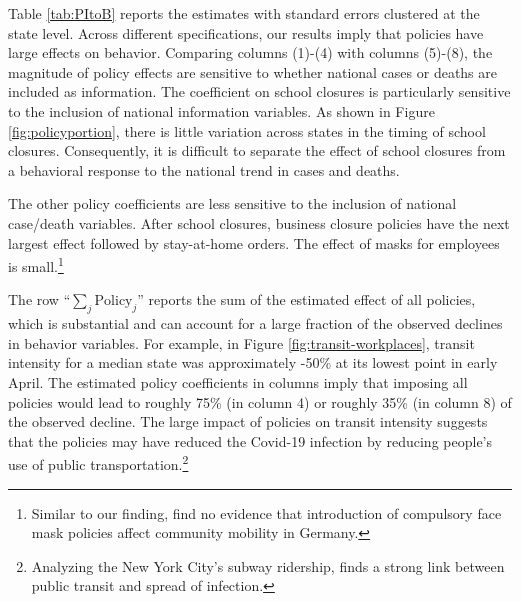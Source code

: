 \documentclass[3p, longtitle]{elsarticle}
\theoremstyle{definition}
\begin{document}
Table \ref{tab:PItoB} reports the estimates  with standard errors clustered at the state level.  Across different
specifications, our results imply that policies have large effects on
behavior. Comparing columns (1)-(4) with columns (5)-(8),
the magnitude of policy effects are sensitive to whether national
cases or deaths are included as information. The coefficient on school
closures is particularly sensitive to the inclusion of national
information variables.  As shown in Figure
\ref{fig:policyportion}, there is little variation across states in
the timing of school closures. Consequently, it is difficult to
separate the effect of school closures from a behavioral response to the national
trend in cases and deaths.

The other policy coefficients are less sensitive to the inclusion of
national case/death variables. After school closures, business closure policies have the next largest effect followed by stay-at-home
orders.  The effect of masks for employees is
small.\footnote{Similar to our finding, \cite{kovacs2020} find no evidence that introduction of compulsory face mask policies affect community mobility in Germany.}




The row ``$\sum_j \mathrm{Policy}_j$'' reports the sum of the estimated
effect of all policies, which is substantial and can account for a
large fraction of the observed declines in behavior variables.  For
example,  in Figure \ref{fig:transit-workplaces}, transit intensity for a median state was approximately -50\% at its lowest point
 in early April. The estimated policy coefficients in columns imply
that imposing all policies would lead to roughly 75\% (in column
4) or roughly 35\% (in column 8) of the observed decline. The large impact of policies on transit intensity suggests that the policies may have reduced the Covid-19 infection by reducing people's use of public transportation.\footnote{Analyzing the New York City's subway ridership,  \cite{NBERw27021} finds  a strong link between public transit and spread of infection.}


\end{document}
